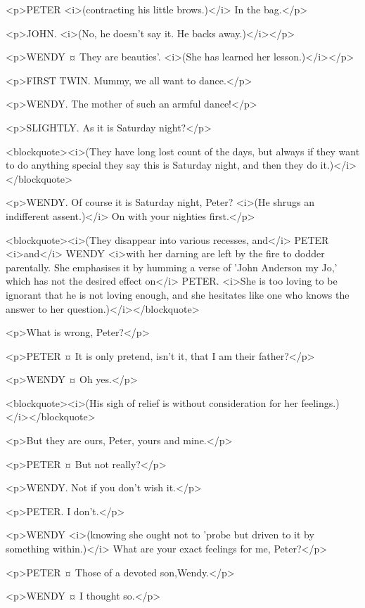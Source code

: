 <p>PETER <i>(contracting his little brows.)</i> In the bag.</p>

<p>JOHN. <i>(No, he doesn't say it. He backs away.)</i></p>

<p>WENDY ¤
They are beauties'. <i>(She has learned her lesson.)</i></p>

<p>FIRST TWIN. Mummy, we all want to dance.</p>

<p>WENDY. The mother of such an armful dance!</p>

<p>SLIGHTLY. As it is Saturday night?</p>

<blockquote><i>(They have long lost count of the days, but always if they want to do anything special they say this is Saturday night, and then they do it.)</i></blockquote>

<p>WENDY. Of course it is Saturday night, Peter? <i>(He shrugs an indifferent assent.)</i> On with your nighties first.</p>

<blockquote><i>(They disappear into various recesses, and</i> PETER <i>and</i> WENDY <i>with her darning are left by the fire to dodder parentally. She emphasises it by humming a verse of 'John Anderson my Jo,' which has not the desired effect on</i> PETER. <i>She is too loving to be ignorant that he is not loving enough, and she hesitates like one who knows the answer to her question.)</i></blockquote>

<p>What is wrong, Peter?</p>

<p>PETER ¤
It is only pretend, isn't it, that I am their father?</p>

<p>WENDY ¤
Oh yes.</p>

<blockquote><i>(His sigh of relief is without consideration for her feelings.)</i></blockquote>

<p>But they are ours, Peter, yours and mine.</p>

<p>PETER ¤
But not really?</p>

<p>WENDY. Not if you don't wish it.</p>

<p>PETER. I don't.</p>

<p>WENDY <i>(knowing she ought not to 'probe but driven to it by something within.)</i> What are your exact feelings for me, Peter?</p>

<p>PETER ¤
Those of a devoted son,Wendy.</p>

<p>WENDY ¤
I thought so.</p>

